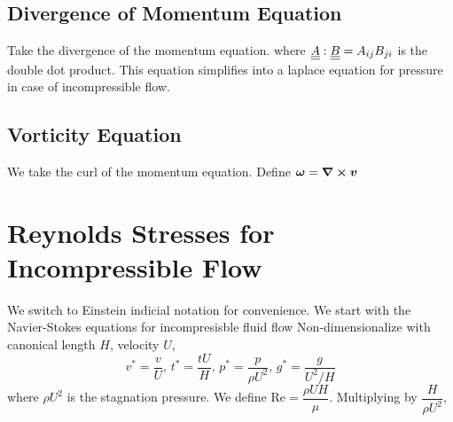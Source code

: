 \subsection{Divergence of Momentum Equation}
Take the divergence of the momentum equation.
where $\underline{\underline{A}}:\underline{\underline{B}}=A_{ij}B_{ji}$ is the double dot product. This equation simplifies into a laplace equation for pressure in case of incompressible flow.
\subsection{Vorticity Equation}
We take the curl of the momentum equation. Define $\boldsymbol{\omega}=\boldsymbol{\nabla}\cross\boldsymbol{v}$
\section{Reynolds Stresses for Incompressible Flow}
We switch to Einstein indicial notation for convenience. We start with the Navier-Stokes equations for incompresisble fluid flow
Non-dimensionalize with canonical length $H$, velocity $U$,
\begin{equation}
    v^*=\dfrac{v}{U},\,t^*=\dfrac{tU}{H},\,p^*=\dfrac{p}{\rho U^2},\,g^*=\dfrac{g}{U^2/H}
\end{equation}
where $\rho U^2$ is the stagnation pressure. We define $\text{Re}=\dfrac{\rho UH}{\mu}.$ Multiplying by $\dfrac{H}{\rho U^2},$

